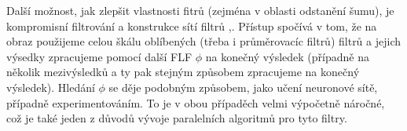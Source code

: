         Další možnost, jak zlepšit vlastnosti fitrů (zejména v oblasti odstanění šumu), je kompromisní filtrování a konstrukce sítí filtrů \cite{Compromise denoise},\cite{Minmax denoise}. Přístup spočívá v tom, že na obraz použijeme celou škálu oblíbených (třeba i průměrovacíc filtrů) filtrů a jejich výsedky zpracujeme pomocí další FLF $\phi$ na konečný výsledek (případně na několik mezivýsledků a ty pak stejným způsobem zpracujeme na konečný výsledek). Hledání $\phi$ se děje podobným způsobem, jako učení neuronové sítě, případně experimentováním. To je v obou případěch velmi výpočetně náročné, což je také jeden z důvodů vývoje paralelních algoritmů pro tyto filtry.



